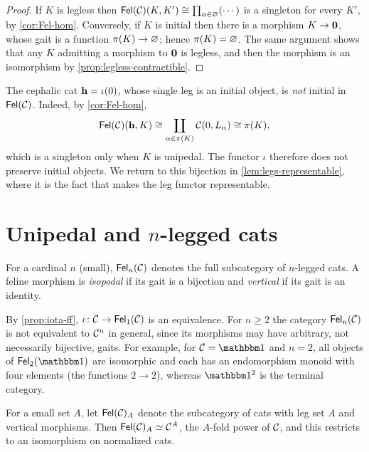 \begin{proof}
If $K$ is legless then $\mathsf{Fel}(\mathcal{C})(K,K')\cong\prod_{\alpha\in\varnothing}(\cdots)$
is a singleton for every $K'$, by \cref{cor:Fel-hom}. Conversely, if $K$ is
initial then there is a morphism $K\to\mathbf{0}$, whose gait is a function
$\pi(K)\to\varnothing$; hence $\pi(K)=\varnothing$. The same argument shows
that any $K$ admitting a morphism to $\mathbf{0}$ is legless, and then the
morphism is an isomorphism by \cref{prop:legless-contractible}.
\end{proof}

\begin{warning}\label{warn:cephalic}
The cephalic cat $\mathbf{h}=\iota(0)$, whose single leg is an initial object,
is \emph{not} initial in $\mathsf{Fel}(\mathcal{C})$. Indeed, by \cref{cor:Fel-hom},
\[
\mathsf{Fel}(\mathcal{C})(\mathbf{h},K)\cong\coprod_{\alpha\in\pi(K)}\mathcal{C}(0,L_\alpha)\cong\pi(K),
\]
which is a singleton only when $K$ is unipedal. The functor $\iota$ therefore
does not preserve initial objects. We return to this bijection in
\cref{lem:legs-representable}, where it is the fact that makes the leg functor
representable.
\end{warning}

\section{Unipedal and $n$-legged cats}\label{sec:unipedal}

\begin{definition}\label{def:n-legged}
For a cardinal $n$ (small), $\mathsf{Fel}_n(\mathcal{C})$ denotes the full subcategory of
$n$-legged cats. A feline morphism is \emph{isopodal} if its gait is a
bijection and \emph{vertical} if its gait is an identity.
\end{definition}

By \cref{prop:iota-ff}, $\iota\colon\mathcal{C}\to\mathsf{Fel}_1(\mathcal{C})$ is an equivalence. For
$n\ge 2$ the category $\mathsf{Fel}_n(\mathcal{C})$ is not equivalent to $\mathcal{C}^n$ in general,
since its morphisms may have arbitrary, not necessarily bijective, gaits. For
example, for $\cC=\one$ and $n=2$, all objects of $\Fel_2(\one)$ are isomorphic and
each has an endomorphism monoid with four elements (the functions $2\to2$),
whereas $\one^2$ is the terminal category.

\begin{proposition}\label{prop:fibre-legs}
For a small set $A$, let $\mathsf{Fel}(\mathcal{C})_A$ denote the subcategory of cats with leg
set $A$ and vertical morphisms. Then $\mathsf{Fel}(\mathcal{C})_A\simeq\mathcal{C}^A$, the $A$-fold power
of $\mathcal{C}$, and this restricts to an isomorphism on normalized cats.
\end{proposition}

